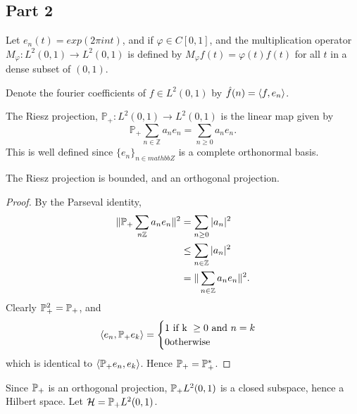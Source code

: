 \documentclass{unswmaths}
\begin{document}
\subsection*{Part 2}
\begin{definition}
    Let $e_n(t) = exp(2\pi i n t)$, and if $\varphi \in C[0,1]$,
    and the multiplication operator $M_\varphi:L^2(0,1)\rightarrow L^2(0,1)$ is defined by $M_\varphi f(t) = \varphi(t)f(t)$
    for all $t$ in a dense subset of $(0,1)$.    
    
    Denote the fourier coefficients of $f \in L^2(0,1)$ by $\hat{f}(n) = \langle f,e_n\rangle$.
\end{definition}
\begin{definition}
    The Riesz projection, $\mathbb{P}_+:L^2(0,1)\rightarrow L^2(0,1)$ is the linear map given by
    \begin{equation*}
        \mathbb{P}_+\sum_{n\in\mathbb{Z}} a_ne_n = \sum_{n\geq 0} a_ne_n.
    \end{equation*}
    This is well defined since $\{e_n\}_{n\in mathbb{Z}}$ is a complete orthonormal basis.
\end{definition}
\begin{lemma}
    The Riesz projection is bounded, and an orthogonal projection.
\end{lemma}
\begin{proof}
    By the Parseval identity,
    \begin{align*}
        \| \mathbb{P}_+ \sum_{n\mathbb{Z}} a_n e_n\|^2 &= \sum_{n\geq 0} |a_n|^2\\
        &\leq \sum_{n\in\mathbb{Z}}|a_n|^2\\
        &= \|\sum_{n\in\mathbb{Z}} a_ne_n\|^2.
    \end{align*}
    Clearly $\mathbb{P}_+^2 = \mathbb{P}_+$, and 
    \begin{equation*}
        \langle e_n,\mathbb{P}_+ e_k\rangle = \begin{cases}
            1\text{ if k }\geq 0\text{ and }n = k\\
            0\text{otherwise}
        \end{cases}
    \end{equation*}
    which is identical to $\langle\mathbb{P}_+ e_n,e_k\rangle$. Hence $\mathbb{P}_+ = \mathbb{P}_+^*$.    
\end{proof}
\begin{definition}
    Since $\mathbb{P}_+$ is an orthogonal projection, $\mathbb{P}_+ L^2(0,1)$ is a closed
    subspace, hence a Hilbert space. Let $\mathcal{H} = \mathbb{P}_+ L^2(0,1)$. 
\end{definition}
\end{document}
